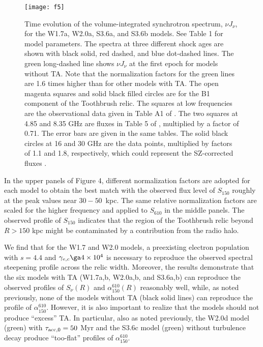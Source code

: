 \documentclass[twocolumn]{aastex61}
\begin{document}
\begin{figure*}[t]
\vspace{-0.8cm}
\hspace{-0.2cm}
\texttt{[image: f5]}
\vspace{-6.3cm}
\caption{Time evolution of the volume-integrated synchrotron spectrum, $\nu J_{\nu}$, for the W1.7a, W2.0a, S3.6a, and S3.6b models.
See Table 1 for model parameters.
The spectra at three different shock ages are shown with black solid, red dashed, and blue dot-dashed lines.
The green long-dashed line shows $\nu J_{\nu}$ at the first epoch for models without TA.
Note that the normalization factors for the green lines are 1.6 times higher than for other models with TA.
The open magenta squares and solid black filled circles are for the B1 component of the Toothbrush relic.
The squares at low frequencies are the observational data given in Table A1 of \citet{stroe16}.
The two squares at 4.85 and 8.35 GHz are fluxes in Table 5 of \citet{kierdorf16}, multiplied by a factor of 0.71.
The error bars are given in the same tables.
The solid black circles at 16 and 30 GHz are the data points, multiplied by factors of 1.1 and 1.8, respectively, which could represent the SZ-corrected fluxes \citep{basu16}.
}
\label{Fig5}
\end{figure*}

In the upper panels of Figure 4, different normalization factors are adopted for each model to obtain the best match with 
the observed flux level of $S_{150}$ roughly at the peak values near $30-50$~kpc.
The same relative normalization factors are scaled for the higher frequency and applied to $S_{610}$ in the middle panels.
The observed profile of $S_{150}$ indicates that the region of the Toothbrush relic beyond $R>150$ kpc 
might be contaminated by a contribution from the radio halo.

We find that for the W1.7 and W2.0 models, a preexisting electron population with $s=4.4$ and 
$\gamma_{e,c}\ga 4\times 10^4$ is necessary to reproduce the observed spectral steepening profile across the relic width.
Moreover, the results demonstrate that the six models with TA (W1.7a,b, W2.0a,b, and S3.6a,b) 
can reproduce the observed profiles of $S_{\nu} (R) $ and $\alpha_{150}^{610} (R)$ reasonably well, 
while, as noted previously, none of the models without TA (black solid lines) can reproduce the profile of $\alpha_{150}^{610}$.
However, it is also important to realize that the models should not produce ``excess'' TA.
In particular, also as noted previously,
the W2.0d model (green) with $\tau_{\rm acc,0}=50$ Myr and 
the S3.6c model (green) without turbulence decay produce ``too-flat'' profiles of $\alpha_{150}^{610}$.
\end{document}
